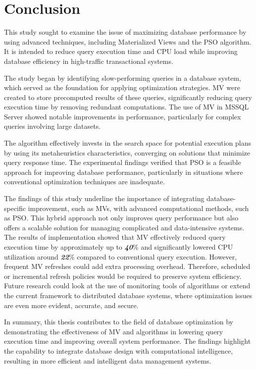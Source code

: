 \section{Conclusion}
This study sought to examine the issue of maximizing database performance by using advanced techniques, including Materialized Views and the PSO algorithm. It is intended to reduce query execution time and CPU load while improving database efficiency in high-traffic transactional systems. 

The study began by identifying slow-performing queries in a database system, which served as the foundation for applying optimization strategies. MV were created to store precomputed results of these queries, significantly reducing query execution time by removing redundant computations. The use of MV in MSSQL Server showed notable improvements in performance, particularly for complex queries involving large datasets.

 The algorithm effectively invests in the search space for potential execution plans by using its metaheuristics characteristics, converging on solutions that minimize query response time. The experimental findings verified that PSO is a feasible approach for improving database performance, particularly in situations where conventional optimization techniques are inadequate.

The findings of this study underline the importance of integrating database-specific improvement, such as MVs, with advanced computational methods, such as PSO. This hybrid approach not only improves query performance but also offers a scalable solution for managing complicated and data-intensive systems. The results of implementation showed that MV effectively reduced query execution time by approximately up to \textbf{\textit{40}}\% and significantly lowered CPU utilization around \textbf{\textit{22}}\% compared to conventional query execution. However, frequent MV refreshes could add extra processing overhead. Therefore, scheduled or incremental refresh policies would be required to preserve system efficiency. Future research could look at the use of monitoring tools of algorithms or extend the current framework to distributed database systems, where optimization issues are even more evident, accurate, and secure.\vspace{.4cm}

In summary, this thesis contributes to the field of database optimization by demonstrating the effectiveness of MV and algorithms in lowering query execution time and improving overall system performance. The findings highlight the capability to integrate database design with computational intelligence, resulting in more efficient and intelligent data management systems.
 